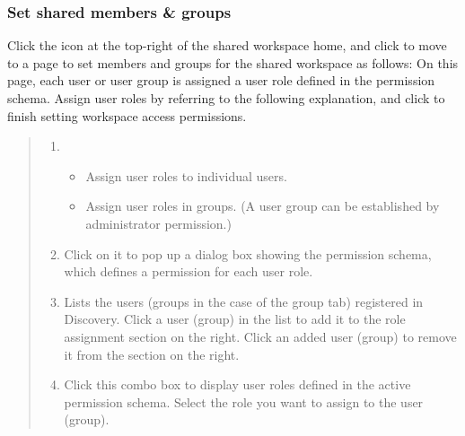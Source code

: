 \documentclass[letterpaper,10pt,english]{sphinxmanual}
\begin{document}
\subsubsection{Set shared members \& groups}
\label{\detokenize{discovery/part03/shared_workspace:shared-members-setup}}\label{\detokenize{discovery/part03/shared_workspace:id8}}
Click the  icon at the top-right of the shared workspace home, and click  to move to a page to set members and groups for the shared workspace as follows: On this page, each user or user group is assigned a user role defined in the permission schema. Assign user roles by referring to the following explanation, and click  to finish setting workspace access permissions.
\begin{quote}

\begin{figure}[H]
\centering

\noindent{}
\end{figure}
\begin{enumerate}
\def\theenumi{\arabic{enumi}}
\def\labelenumi{\theenumi .}
\makeatletter\def\p@enumii{\p@enumi \theenumi .}\makeatother
\item {} 
\begin{itemize}
\item {} 
 Assign user roles to individual users.

\item {} 
 Assign user roles in groups. (A user group can be established by administrator permission.)

\end{itemize}

\item {} 
 Click on it to pop up a dialog box showing the permission schema, which defines a permission for each user role.

\item {} 
 Lists the users (groups in the case of the group tab) registered in Discovery. Click a user (group) in the list to add it to the role assignment section on the right. Click an added user (group) to remove it from the section on the right.

\item {} 
 Click this combo box to display user roles defined in the active permission schema. Select the role you want to assign to the user (group).

\end{enumerate}
\end{quote}
\end{document}

